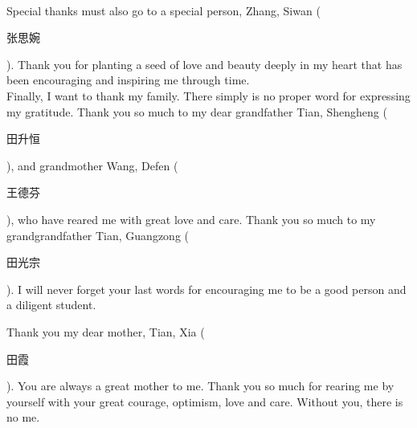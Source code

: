 \\
Special thanks must also go to a special person, Zhang, Siwan (\begin{CJK}{UTF8}{gbsn}张思婉\end{CJK}). Thank you for planting a seed of love and beauty deeply in my heart that has been encouraging and inspiring me through time.    
\\
Finally, I want to thank my family. There simply is no proper word for expressing my gratitude. Thank you so much to my dear grandfather Tian, Shengheng (\begin{CJK}{UTF8}{gbsn}田升恒\end{CJK}), and grandmother Wang, Defen (\begin{CJK}{UTF8}{gbsn}王德芬\end{CJK}), who have reared me with great love and care. Thank you so much to my grandgrandfather Tian, Guangzong (\begin{CJK}{UTF8}{gbsn}田光宗\end{CJK}). I will never forget your last words for encouraging me to be a good person and a diligent student.

Thank you my dear mother, Tian, Xia (\begin{CJK}{UTF8}{gbsn}田霞\end{CJK}). You are always a great mother to me. Thank you so much for rearing me by yourself with your great courage, optimism, love and care. Without you, there is no me.
